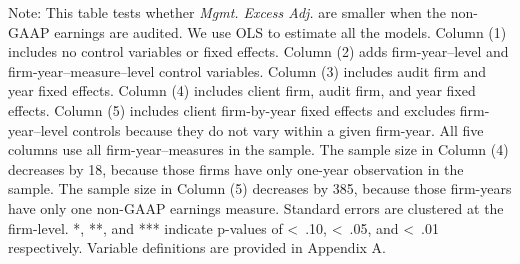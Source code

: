 \documentclass[12pt,fleqn]{article}
\begin{document}
\clearpage
\begin{landscape}
\begin{table}[!htbp] 
    \begin{threeparttable}[b]
        \captionsetup{labelfont = bf, singlelinecheck = off, justification = raggedright, labelsep = none}   
        \caption{\\Are Audited Non-GAAP Adjustments Less Aggressive?}
        \centering
        \footnotesize

        \begin{flushleft}
           {\raggedright
           
           \par}
        \end{flushleft}

        \vspace{-6 mm}        
        \begin{tablenotes}
            \scriptsize
            \item Note: This table tests whether \textit{Mgmt. Excess Adj.} are smaller when the non-GAAP earnings are audited. We use OLS to estimate all the models. Column (1) includes no control variables or fixed effects. Column (2) adds firm-year–level and firm-year–measure–level control variables. Column (3) includes audit firm and year fixed effects. Column (4) includes client firm, audit firm, and year fixed effects. Column (5) includes client firm-by-year fixed effects and excludes firm-year–level controls because they do not vary within a given firm-year. All five columns use all firm-year–measures in the sample. The sample size in Column (4) decreases by 18, because those firms have only one-year observation in the sample. The sample size in Column (5) decreases by 385, because those firm-years have only one non-GAAP earnings measure. Standard errors are clustered at the firm-level. *, **, and *** indicate p-values of \textless\, .10, \textless\, .05, and \textless\, .01 respectively. Variable definitions are provided in Appendix A.
        \end{tablenotes}
        \label{table:street}

    \end{threeparttable}
\end{table}
\end{landscape}
\end{document}
